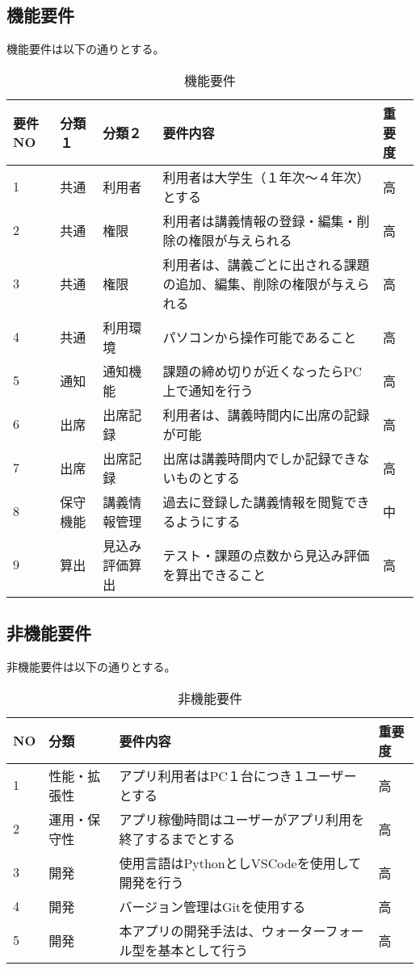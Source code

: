 \documentclass[a4paper, 11pt, titlepage]{jsarticle}
\begin{document}
\clearpage

\subsection{機能要件}
機能要件は以下の通りとする。
\begin{table}[htbp]
  \centering
  {\scriptsize
  \begin{tabular}{|l|l|l|l|l|}
    \hline
    要件NO & 分類１ & 分類２ & 要件内容 & 重要度 \\ \hline \hline
    1 & 共通 & 利用者 & 利用者は大学生（１年次〜４年次）とする & 高\\ \hline
    2 & 共通 & 権限 & 利用者は講義情報の登録・編集・削除の権限が与えられる & 高\\ \hline
    3 & 共通 & 権限 & 利用者は、講義ごとに出される課題の追加、編集、削除の権限が与えられる & 高\\ \hline
    4 & 共通 & 利用環境 & パソコンから操作可能であること & 高\\ \hline
    5 & 通知 & 通知機能 & 課題の締め切りが近くなったらPC上で通知を行う & 高 \\ \hline
    6 & 出席 & 出席記録 & 利用者は、講義時間内に出席の記録が可能 & 高\\ \hline
    7 & 出席 & 出席記録 & 出席は講義時間内でしか記録できないものとする & 高\\ \hline
    8 & 保守機能 & 講義情報管理 & 過去に登録した講義情報を閲覧できるようにする & 中 \\ \hline
    9 & 算出 & 見込み評価算出 & テスト・課題の点数から見込み評価を算出できること & 高 \\ \hline
  \end{tabular}
  }
  \caption{機能要件}
  \label{tb:kinou}
\end{table}

\subsection{非機能要件}
非機能要件は以下の通りとする。
\begin{table}[htbp]
  \centering
  {\scriptsize
  \begin{tabular}{|l|l|l|l|}
    \hline
    NO & 分類 & 要件内容 & 重要度 \\ \hline \hline
    1 & 性能・拡張性 & アプリ利用者はPC１台につき１ユーザーとする & 高\\ \hline
    2 & 運用・保守性 & アプリ稼働時間はユーザーがアプリ利用を終了するまでとする & 高\\ \hline
    3 & 開発 & 使用言語はPythonとしVSCodeを使用して開発を行う & 高\\ \hline
    4 & 開発 & バージョン管理はGitを使用する & 高\\ \hline
    5 & 開発 & 本アプリの開発手法は、ウォーターフォール型を基本として行う & 高\\ \hline
  \end{tabular}
  }
  \caption{非機能要件}
  \label{tb:n-kinou}
\end{table}
\end{document}
